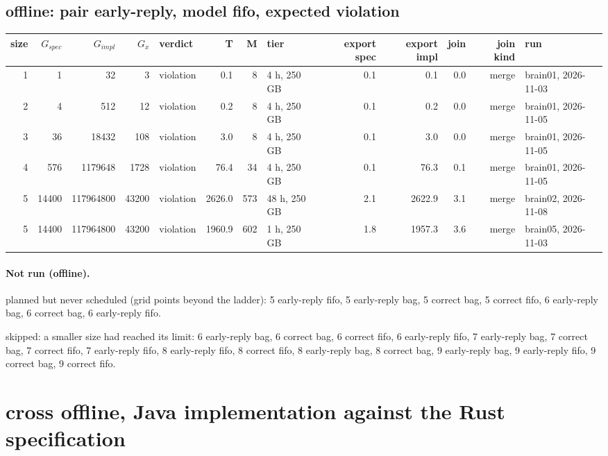 \documentclass[10pt]{article}
\begin{document}
\subsection*{offline: pair \textsf{early-reply}, model fifo, expected violation}
\begin{longtable}{@{}rrrrlrrlrrrrl@{}}
\toprule
size & $G_{\mathit{spec}}$ & $G_{\mathit{impl}}$ & $G_x$ & verdict & T & M & tier & export spec & export impl & join & join kind & run \\
\midrule
\endhead
\color{blue} 1 & 1 & 32 & 3 & violation & 0.1 & 8 & 4 h, 250 GB & 0.1 & 0.1 & 0.0 & merge & brain01, 2026-11-03 \\
\color{blue} 2 & 4 & 512 & 12 & violation & 0.2 & 8 & 4 h, 250 GB & 0.1 & 0.2 & 0.0 & merge & brain01, 2026-11-05 \\
\color{blue} 3 & 36 & 18432 & 108 & violation & 3.0 & 8 & 4 h, 250 GB & 0.1 & 3.0 & 0.0 & merge & brain01, 2026-11-05 \\
\color{blue} 4 & 576 & 1179648 & 1728 & violation & 76.4 & 34 & 4 h, 250 GB & 0.1 & 76.3 & 0.1 & merge & brain01, 2026-11-05 \\
\color{blue} 5 & 14400 & 117964800 & 43200 & violation & 2626.0 & 573 & 48 h, 250 GB & 2.1 & 2622.9 & 3.1 & merge & brain02, 2026-11-08 \\
\color{red} 5 & 14400 & 117964800 & 43200 & violation & 1960.9 & 602 & 1 h, 250 GB & 1.8 & 1957.3 & 3.6 & merge & brain05, 2026-11-03 \\
\bottomrule
\end{longtable}
\paragraph{Not run (offline).}
planned but never scheduled (grid points beyond the ladder): 5 early-reply fifo, 5 early-reply bag, 5 correct bag, 5 correct fifo, 6 early-reply bag, 6 correct bag, 6 early-reply fifo.\par
skipped: a smaller size had reached its limit: 6 early-reply bag, 6 correct bag, 6 correct fifo, 6 early-reply fifo, 7 early-reply bag, 7 correct bag, 7 correct fifo, 7 early-reply fifo, 8 early-reply fifo, 8 correct fifo, 8 early-reply bag, 8 correct bag, 9 early-reply bag, 9 early-reply fifo, 9 correct bag, 9 correct fifo.\par
\section*{cross offline, Java implementation against the Rust specification}
\end{document}
